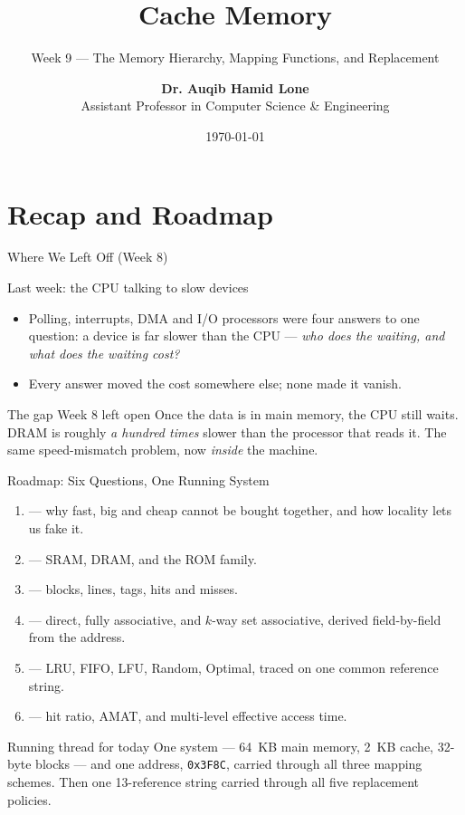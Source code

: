\documentclass[aspectratio=169]{beamer}
\title{Cache Memory}
\subtitle{Week 9 --- The Memory Hierarchy, Mapping Functions, and Replacement}
\author[Dr. Auqib Hamid Lone]{%
  \textbf{Dr. Auqib Hamid Lone}\\
  \small Assistant Professor in Computer Science \& Engineering
}
\institute[GCET Ganderbal]{%
  \small\textbf{PCC CS-401: Computer Organization and Architecture}\\[0.3em]
  Department of Computer Science \& Engineering\\
  Government College of Engineering \& Technology (GCET), Ganderbal
}
\date[\today]{\small\today}
\begin{document}
\frame{\titlepage}

\section{Recap and Roadmap}

\begin{frame}{Where We Left Off (Week 8)}
  \begin{block}{Last week: the CPU talking to slow devices}
    \begin{itemize}
      \item Polling, interrupts, DMA and I/O processors were four answers to
        one question: a device is far slower than the CPU --- \emph{who does
        the waiting, and what does the waiting cost?}
      \item Every answer moved the cost somewhere else; none made it vanish.
    \end{itemize}
  \end{block}
  \begin{exampleblock}{The gap Week 8 left open}
    Once the data is in main memory, the CPU still waits. DRAM is roughly
    \emph{a hundred times} slower than the processor that reads it. The same
    speed-mismatch problem, now \emph{inside} the machine.
  \end{exampleblock}
\end{frame}

\begin{frame}{Roadmap: Six Questions, One Running System}
  \begin{enumerate}
    \item {} --- why fast, big and cheap cannot be bought
      together, and how locality lets us fake it.
    \item {} --- SRAM, DRAM, and the ROM family.
    \item {} --- blocks, lines, tags, hits and misses.
    \item {} --- direct, fully associative, and $k$-way
      set associative, derived field-by-field from the address.
    \item {} --- LRU, FIFO, LFU, Random, Optimal,
      traced on one common reference string.
    \item {} --- hit ratio, AMAT, and multi-level effective
      access time.
  \end{enumerate}
  \vspace{0.15cm}
  \begin{alertblock}{Running thread for today}
    One system --- 64~KB main memory, 2~KB cache, 32-byte blocks --- and one
    address, \texttt{0x3F8C}, carried through all three mapping schemes. Then
    one 13-reference string carried through all five replacement policies.
  \end{alertblock}
\end{frame}
\end{document}
